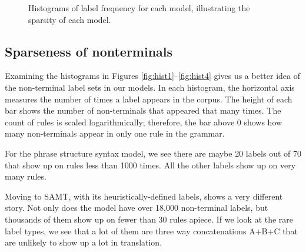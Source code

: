 \documentclass[a4paper]{article}
\begin{document}
\begin{figure}[t!]
\begin{center}
	
\caption{Histograms of label frequency for each model, illustrating the sparsity of each model.}
\end{center}
\end{figure}





\subsection{Sparseness of nonterminals}

Examining the histograms in Figures \ref{fig:hist1}--\ref{fig:hist4} gives us a better idea of the non-terminal label sets in our models. In each histogram, the horizontal axis measures the number of times a label appears in the corpus. The height of each bar shows the number of non-terminals that appeared that many times. The count of rules is scaled logarithmically; therefore, the bar above 0 shows how many non-terminals appear in only one rule in the grammar.

For the phrase structure syntax model, we see there are maybe 20 labels out of 70 that show up on rules less than 1000 times. All the other labels show up on very many rules.

Moving to SAMT, with its heuristically-defined labels, shows a very different story. Not only does the model have over 18,000 non-terminal labels, but thousands of them show up on fewer than 30 rules apiece. If we look at the rare label types, we see that a lot of them are three way concatenations A+B+C that are unlikely to show up a lot in translation. 
\end{document}
